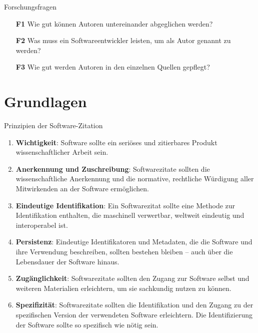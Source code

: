 \documentclass[%
    handout,
    aspectratio=1610,
    10pt,
    onlytextwidth, %
]{beamer}
\begin{document}
\begin{frame}{Forschungsfragen}
    \begin{itemize}
      \item[\textcolor{links}{\textbf{F1}}] Wie gut können Autoren untereinander abgeglichen werden?
      \item[\textcolor{links}{\textbf{F2}}] Was muss ein Softwareentwickler leisten, um als Autor genannt zu werden?
      \item[\textcolor{links}{\textbf{F3}}] Wie gut werden Autoren in den einzelnen Quellen gepflegt?
    \end{itemize}
\end{frame}

\section{Grundlagen}

\begin{frame}{Prinzipien der Software-Zitation \autocite{smith_software_2016}}
    \begin{enumerate}
        \item \textcolor{links}{\textbf{Wichtigkeit}}: Software sollte ein seriöses und zitierbares Produkt wissenschaftlicher Arbeit sein.
        \item \textcolor{links}{\textbf{Anerkennung und Zuschreibung}}: Softwarezitate sollten die wissenschaftliche Anerkennung und die normative, rechtliche Würdigung aller Mitwirkenden an der Software ermöglichen.
        \item \textcolor{links}{\textbf{Eindeutige Identifikation}}: Ein Softwarezitat sollte eine Methode zur Identifikation enthalten, die maschinell verwertbar, weltweit eindeutig und interoperabel ist.
        \item \textcolor{links}{\textbf{Persistenz}}: Eindeutige Identifikatoren und Metadaten, die die Software und ihre Verwendung beschreiben, sollten bestehen bleiben – auch über die Lebensdauer der Software hinaus.
        \item \textcolor{links}{\textbf{Zugänglichkeit}}: Softwarezitate sollten den Zugang zur Software selbst und weiteren Materialien erleichtern, um sie sachkundig nutzen zu können.
        \item \textcolor{links}{\textbf{Spezifizität}}: Softwarezitate sollten die Identifikation und den Zugang zu der spezifischen Version der verwendeten Software erleichtern. Die Identifizierung der Software sollte so spezifisch wie nötig sein.
    \end{enumerate}
\end{frame}
\end{document}
